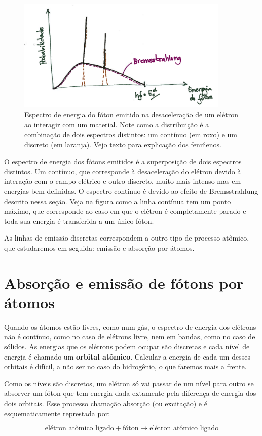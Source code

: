 \documentclass{article}
\begin{document}
\begin{figure}[ht]
\includegraphics[width=0.9\textwidth]{brem.png}
\caption{\label{fig:brem}Espectro de energia do f\'oton emitido na desacelera\c c\~ao de um el\'etron ao interagir com um material. Note como a distribui\c c\~ao \'e a combina\c c\~ao de dois espectros distintos: um cont\'inuo (em roxo) e um discreto (em laranja). Vejo texto para explica\c c\~ao dos fen\^menos.}
\end{figure}
O espectro de energia dos f\'otons emitidos \'e a superposi\c c\~ao de dois espectros distintos. Um cont\'inuo, que corresponde \`a desacelera\c c\~ao do el\'etron devido \`a intera\c c\~ao com o campo el\'etrico e outro discreto, muito mais intenso mas em energias bem definidas. O espectro cont\'inuo \'e devido ao efeito de Bremsstrahlung descrito nessa se\c c\~ao. Veja na figura como a linha cont\'inua tem um ponto m\'aximo, que corresponde ao caso em que o el\'etron \'e completamente parado e toda sua energia \'e transferida a um \'unico f\'oton.

As linhas de emiss\~ao discretas correspondem a outro tipo de processo at\^omico, que estudaremos em seguida: emiss\~ao e absor\c c\~ao por \'atomos.

\section{Absor\c c\~ao e emiss\~ao de f\'otons por \'atomos}

Quando os \'atomos est\~ao livres, como num g\'as, o espectro de energia dos el\'etrons n\~ao \'e cont\'inuo, como no caso de el\'etrons livre, nem em bandas, como no caso de s\'olidos. As energias que os el\'etrons podem ocupar s\~ao discretas e cada n\'ivel de energia \'e chamado um \textbf{orbital at\^omico}. Calcular a energia de cada um desses orbitais \'e dif\'icil, a n\~ao ser no caso do hidrog\^enio, o que faremos mais a frente.

Como os n\'iveis s\~ao discretos, um el\'etron s\'o vai passar de um n\'ivel para outro se absorver um f\'oton que tem energia dada extamente pela diferen\c ca de energia dos dois orbitais. Esse processo chama\c c\~ao absor\c c\~ao (ou excita\c c\~ao) e \'e esquematicamente represtada por:

\begin{equation}
\text{el\'etron at\^omico ligado} + \text{f\'oton} \rightarrow \text{el\'etron at\^omico ligado}
\end{equation}
\end{document}
